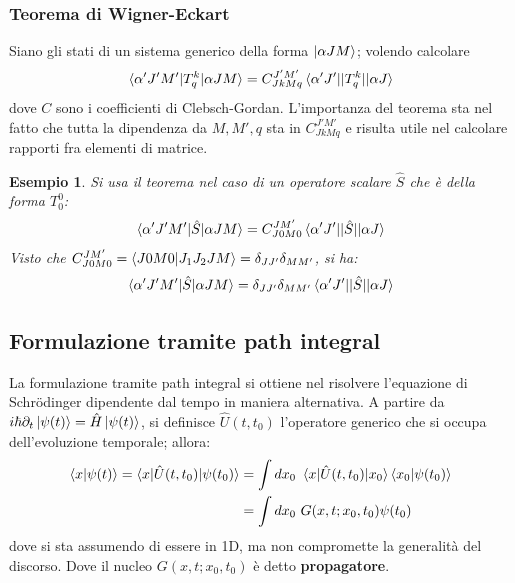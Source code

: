 \documentclass[11pt, a4paper]{scrartcl} %
\numberwithin{equation}{subsection}
\theoremstyle{style2}
\theoremstyle{style1}
\newtheorem{esempio}{Esempio}[section]
\begin{document}
\subsubsection{Teorema di Wigner-Eckart}
Siano gli stati di un sistema generico della forma $\ket{\alpha J M } $; volendo calcolare
\[
\braket{\alpha 'J'M'|T^k_q|\alpha JM} =C^{J'M'}_{JkMq} \braket{\alpha ' J'||T^k_q||\alpha J} 
\] 
dove $C$ sono i coefficienti di Clebsch-Gordan. 
L'importanza del teorema sta nel fatto che tutta la dipendenza da $M,M',q$ sta in $C^{J'M'} _{JkMq} $ e risulta utile nel calcolare rapporti fra elementi di matrice.

\begin{esempio}
	Si usa il teorema nel caso di un operatore scalare $\hat{S}$ che \`e della forma $T^0_0$:
	\[
		\braket{\alpha ' J'M'|\hat{S}|\alpha JM} = C^{JM'} _{J0M0}  \braket{\alpha 'J'||\hat{S} ||\alpha J} 
	\] 
	Visto che $C^{JM'} _{J0M0}=\braket{J 0 M 0|J_1J_2 J M} = \delta _{JJ'}\delta _{MM'}  $, si ha:
	\[
	\braket{\alpha ' J'M'|\hat{S}|\alpha JM} = \delta _{JJ'} \delta_{ MM'} \braket{\alpha 'J'||\hat{S}||\alpha J} 
	\] 
\end{esempio}
\subsection{Formulazione tramite path integral}
La formulazione tramite path integral si ottiene nel risolvere l'equazione di Schr\"odinger dipendente dal tempo in maniera alternativa. 
A partire da $i\hbar  \partial _t \ket{\psi (t)}  =  \hat{H}\ket{\psi (t)} $, si definisce $\hat{U}(t,t_0)$ l'operatore generico che si occupa dell'evoluzione temporale; allora:
\begin{equation}
	\begin{split}
		\braket{x|\psi (t)}  = \braket{x |\hat{U}(t,t_0)|\psi (t_0)} &= \int dx_0 \ \braket{x|\hat{U}(t,t_0)|x_0} \braket{x_0|\psi (t_0)} \\
				     &= \int dx_0\ G(x,t; x_0,t_0) \psi (t_0) 
	\end{split}
\end{equation}
dove si sta assumendo di essere in 1D, ma non compromette la generalit\`a del discorso.
Dove il nucleo $G(x,t;x_0,t_0)$ \`e detto \textbf{propagatore}.
\end{document}
